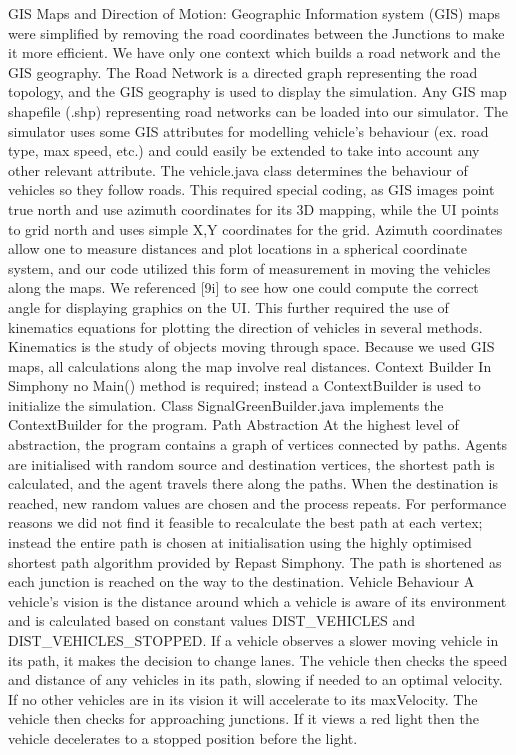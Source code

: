 \documentclass[11pt]{article}
\begin{document}
GIS Maps and Direction of Motion:
Geographic Information system (GIS) maps were simplified by removing the road coordinates between the Junctions to make it more efficient. We have only one context which builds a road network and the GIS geography. The Road Network is a directed graph representing the road topology, and the GIS geography is used to display the simulation.
Any GIS map shapefile (.shp) representing road networks can be loaded into our simulator. The simulator uses some GIS attributes for modelling vehicle’s behaviour (ex. road type, max speed, etc.) and could easily be extended to take into account any other relevant attribute.
The vehicle.java class determines the behaviour of vehicles so they follow roads. This required special coding, as GIS images point true north and use azimuth coordinates for its 3D mapping, while the UI points to grid north and uses simple X,Y coordinates for the grid. Azimuth coordinates allow one to measure distances and plot locations in a spherical coordinate system, and our code utilized this form of measurement in moving the vehicles along the maps. We referenced [9i] to see how one could compute the correct angle for displaying graphics on the UI. This further required the use of kinematics equations for plotting the direction of vehicles in several methods. Kinematics is the study of objects moving through space. Because we used GIS maps, all calculations along the map involve real distances.
Context Builder
In Simphony no Main() method is required; instead a ContextBuilder is used to initialize the simulation. Class SignalGreenBuilder.java implements the ContextBuilder for the program.
Path Abstraction
At the highest level of abstraction, the program contains a graph of vertices connected by paths. Agents are initialised with random source and destination vertices, the shortest path is calculated, and the agent travels there along the paths. When the destination is reached, new random values are chosen and the process repeats. 
For performance reasons we did not find it feasible to recalculate the best path at each vertex; instead the entire path is chosen at initialisation using the highly optimised shortest path algorithm provided by Repast Simphony. The path is shortened as each junction is reached on the way to the destination. 
Vehicle Behaviour
A vehicle’s vision is the distance around which a vehicle is aware of its environment and is calculated based on constant values DIST_VEHICLES and DIST_VEHICLES_STOPPED.
If a vehicle observes a slower moving vehicle in its path, it makes the decision to change lanes. The vehicle then checks the speed and distance of any vehicles in its path, slowing if needed to an optimal velocity. If no other vehicles are in its vision it will accelerate to its maxVelocity. The vehicle then checks for approaching junctions. If it views a red light then the vehicle decelerates to a stopped position before the light. 
\end{document}
